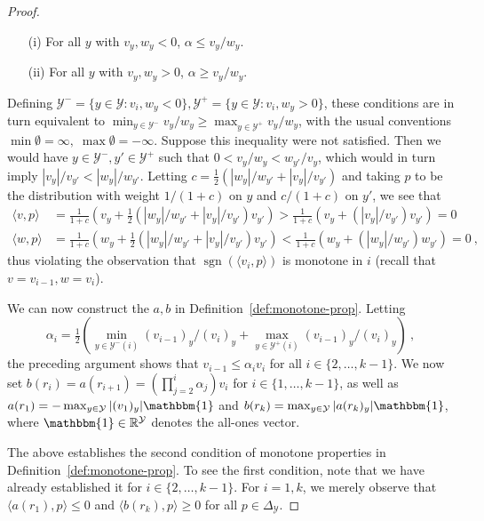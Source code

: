 \documentclass[anon]{colt2020} %
\newcommand{\reals}{\mathbb{R}}
\newcommand{\simplex}{\Delta_\Y}
\newcommand{\Y}{\mathcal{Y}}
\newcommand{\inprod}[2]{\langle #1, #2 \rangle}%
\newcommand{\ones}{\mathbbm{1}}
\DeclareMathOperator*{\sgn}{sgn}
\begin{document}
\begin{proof}
	\begin{enumerate}
		\item[(i)] For all $y$ with $v_y,w_y < 0$, $\alpha \leq v_y/w_y$.
		\item[(ii)] For all $y$ with $v_y,w_y > 0$, $\alpha \geq v_y/w_y$.
	\end{enumerate}
	Defining $\Y^- = \{y\in\Y: v_i,w_y < 0\}, \Y^+ = \{y\in\Y: v_i,w_y > 0\}$, these conditions are in turn equivalent to $\min_{y\in\Y^-} v_y/w_y \geq \max_{y\in\Y^+} v_y/w_y$, with the usual conventions $\min \emptyset = \infty,\; \max \emptyset = -\infty$.
	Suppose this inequality were not satisfied.
	Then we would have $y \in \Y^-,y'\in\Y^+$ such that $0 < v_y/w_y < w_{y'}/v_y$, which would in turn imply $|v_y|/v_{y'} < |w_y| / w_{y'}$.
	Letting $c = \tfrac 1 2 \left(|w_y| / w_{y'} + |v_y|/v_{y'}\right)$ and taking $p$ to be the distribution with weight $1/(1+c)$ on $y$ and $c/(1+c)$ on $y'$, we see that
	\begin{align*}
	\inprod{v}{p} &= \frac 1 {1+c} \left(v_y + \tfrac 1 2 (|w_y| / w_{y'} + |v_y|/v_{y'})v_{y'}\right) > \frac 1 {1+c} \left(v_y + (|v_y|/v_{y'})v_{y'}\right) = 0
	\\
	\inprod{w}{p} &= \frac 1 {1+c} \left(w_y + \tfrac 1 2 (|w_y| / w_{y'} + |v_y|/v_{y'})v_{y'}\right) < \frac 1 {1+c} \left(w_y + (|w_y|/w_{y'})w_{y'}\right) = 0~,
	\end{align*}
	thus violating the observation that $\sgn(\inprod{v_i}{p})$ is monotone in $i$ (recall that $v = v_{i-1}, w = v_{i}$).
	
	We can now construct the $a,b$ in Definition~\ref{def:monotone-prop}.
	Letting
	\[\alpha_i = \tfrac 1 2 \left(\min_{y\in\Y^-(i)} (v_{i-1})_y/(v_{i})_y + \max_{y\in\Y^+(i)} (v_{i-1})_y/(v_{i})_y\right)~,\] the preceding argument shows that $v_{i-1} \leq \alpha_i v_{i}$ for all $i \in \{2,\ldots,k-1\}$.
	We now set $b(r_i) = a(r_{i+1}) = (\prod_{j=2}^i \alpha_j) v_i$ for $i\in\{1,\ldots,k-1\}$, as well as $a(r_1) = -\max_{y\in\Y} |(v_1)_y|\ones$ and $b(r_k) = \max_{y\in\Y} |a(r_k)_y|\ones$, where $\ones\in\reals^\Y$ denotes the all-ones vector.
	
	The above establishes the second condition of monotone properties in Definition~\ref{def:monotone-prop}.
	To see the first condition, note that we have already established it for $i\in\{2,\ldots,k-1\}$.
	For $i=1,k$, we merely observe that $\inprod{a(r_1)}{p} \leq 0$ and $\inprod{b(r_k)}{p} \geq 0$ for all $p\in\simplex$.
\end{proof}
\end{document}
